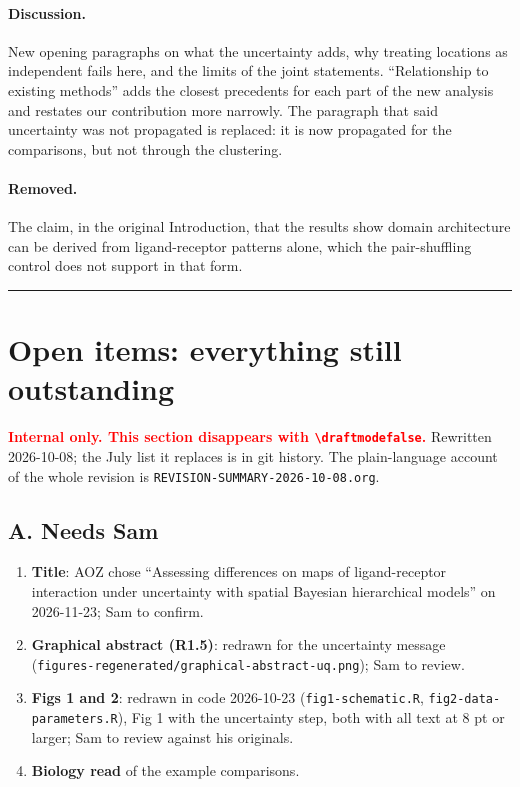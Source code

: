 \documentclass[11pt]{article}
\newif\ifdraftmode\draftmodetrue
\begin{document}
\paragraph{Discussion.} New opening paragraphs on what the uncertainty adds, why treating
locations as independent fails here, and the limits of the joint statements. ``Relationship to
existing methods'' adds the closest precedents for each part of the new analysis and restates our
contribution more narrowly. The paragraph that said uncertainty was not propagated is replaced:
it is now propagated for the comparisons, but not through the clustering.

\paragraph{Removed.} The claim, in the original Introduction, that the results show domain
architecture can be derived from ligand-receptor patterns alone, which the pair-shuffling control
does not support in that form.

\vspace{1em}
\hrule

\ifdraftmode
\section{Open items: everything still outstanding}

\noindent\textcolor{red}{\textbf{Internal only. This section disappears with \texttt{\textbackslash draftmodefalse}.}}
Rewritten 2026-10-08; the July list it replaces is in git history. The plain-language account of
the whole revision is \texttt{REVISION-SUMMARY-2026-10-08.org}.

\subsection*{A. Needs Sam}

\begin{enumerate}[leftmargin=*]
\item \textbf{Title}: AOZ chose ``Assessing differences on maps of ligand-receptor interaction under uncertainty with spatial Bayesian hierarchical models'' on 2026-11-23; Sam to confirm.
\item \textbf{Graphical abstract (R1.5)}: redrawn for the uncertainty message
(\texttt{figures-regenerated/graphical-abstract-uq.png}); Sam to review.
\item \textbf{Figs 1 and 2}: redrawn in code 2026-10-23 (\texttt{fig1-schematic.R},
\texttt{fig2-data-parameters.R}), Fig 1 with the uncertainty step, both with all text at 8 pt or
larger; Sam to review against his originals.
\item \textbf{Biology read} of the example comparisons.
\end{enumerate}
\end{document}

